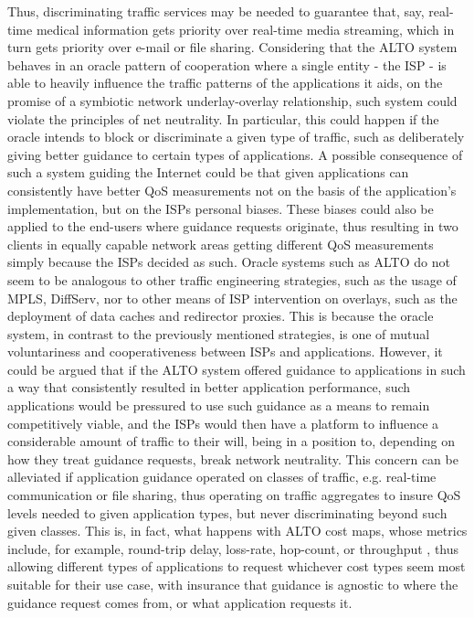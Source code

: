     Thus, discriminating traffic services may be needed to guarantee that, say, real-time medical information gets priority over real-time media streaming, which in turn gets priority over e-mail or file sharing.
    Considering that the ALTO system behaves in an oracle pattern of cooperation where a single entity - the ISP - is able to heavily influence the traffic patterns of the applications it aids, on the promise of a symbiotic network underlay-overlay relationship, such system could violate the principles of net neutrality.
    In particular, this could happen if the oracle intends to block or discriminate a given type of traffic, such as deliberately giving better guidance to certain types of applications.
    A possible consequence of such a system guiding the Internet could be that given applications can consistently have better QoS measurements not on the basis of the application's implementation, but on the ISPs personal biases.
    These biases could also be applied to the end-users where guidance requests originate, thus resulting in two clients in equally capable network areas getting different QoS measurements simply because the ISPs decided as such.
    Oracle systems such as ALTO do not seem to be analogous to other traffic engineering strategies, such as the usage of MPLS, DiffServ, nor to other means of ISP intervention on overlays, such as the deployment of data caches and redirector proxies.
    This is because the oracle system, in contrast to the previously mentioned strategies, is one of mutual voluntariness and cooperativeness between ISPs and applications.
    However, it could be argued that if the ALTO system offered guidance to applications in such a way that consistently resulted in better application performance, such applications would be pressured to use such guidance as a means to remain competitively viable, and the ISPs would then have a platform to influence a considerable amount of traffic to their will, being in a position to, depending on how they treat guidance requests, break network neutrality.
    This concern can be alleviated if application guidance operated on classes of traffic, e.g. real-time communication or file sharing, thus operating on traffic aggregates to insure QoS levels needed to given application types, but never discriminating beyond such given classes.
    This is, in fact, what happens with ALTO cost maps, whose metrics include, for example, round-trip delay, loss-rate, hop-count, or throughput \cite{alto-cost-metrics}, thus allowing different types of applications to request whichever cost types seem most suitable for their use case, with insurance that guidance is agnostic to where the guidance request comes from, or what application requests it.

